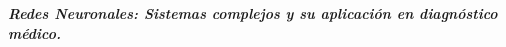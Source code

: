 \documentclass[letterpaper]{article}
\newcommand{\Title}[1]{\begin{center}\LARGE\textbf{\textit{#1}}\end{center}}
\begin{document}
\Title{Redes Neuronales: Sistemas complejos y su aplicación en diagnóstico médico.}


\setlength{\parindent}{1.5em}
\setlength{\parskip}{0pt}
\tableofcontents





%





\end{document}
